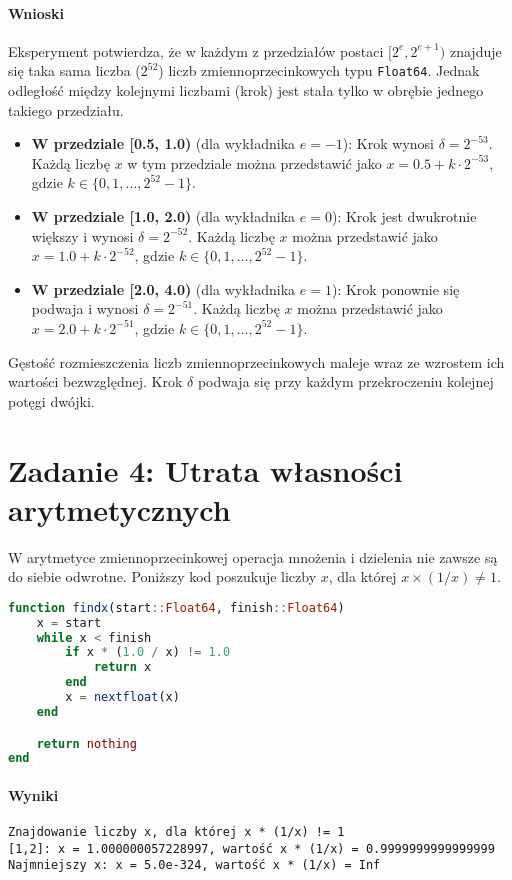 \documentclass[a4paper,12pt]{article}
\begin{document}
\paragraph{Wnioski}
Eksperyment potwierdza, że w każdym z przedziałów postaci $[2^e, 2^{e+1})$ znajduje się taka sama liczba ($2^{52}$) liczb zmiennoprzecinkowych typu \texttt{Float64}. Jednak odległość między kolejnymi liczbami (krok) jest stała tylko w obrębie jednego takiego przedziału.

\begin{itemize}
    \item \textbf{W przedziale [0.5, 1.0)} (dla wykładnika $e=-1$): Krok wynosi $\delta = 2^{-53}$. Każdą liczbę $x$ w tym przedziale można przedstawić jako $x = 0.5 + k \cdot 2^{-53}$, gdzie $k \in \{0, 1, \dots, 2^{52}-1\}$.
    \item \textbf{W przedziale [1.0, 2.0)} (dla wykładnika $e=0$): Krok jest dwukrotnie większy i wynosi $\delta = 2^{-52}$. Każdą liczbę $x$ można przedstawić jako $x = 1.0 + k \cdot 2^{-52}$, gdzie $k \in \{0, 1, \dots, 2^{52}-1\}$.
    \item \textbf{W przedziale [2.0, 4.0)} (dla wykładnika $e=1$): Krok ponownie się podwaja i wynosi $\delta = 2^{-51}$. Każdą liczbę $x$ można przedstawić jako $x = 2.0 + k \cdot 2^{-51}$, gdzie $k \in \{0, 1, \dots, 2^{52}-1\}$.
\end{itemize}

Gęstość rozmieszczenia liczb zmiennoprzecinkowych maleje wraz ze wzrostem ich wartości bezwzględnej. Krok $\delta$ podwaja się przy każdym przekroczeniu kolejnej potęgi dwójki.

\section{Zadanie 4: Utrata własności arytmetycznych}

W arytmetyce zmiennoprzecinkowej operacja mnożenia i dzielenia nie zawsze są do siebie odwrotne. Poniższy kod poszukuje liczby $x$, dla której $x \times (1/x) \neq 1$.

\begin{lstlisting}[language=Julia]
function findx(start::Float64, finish::Float64)
    x = start
    while x < finish
        if x * (1.0 / x) != 1.0
            return x
        end
        x = nextfloat(x)
    end

    return nothing
end
\end{lstlisting}

\paragraph{Wyniki}
\begin{verbatim}
Znajdowanie liczby x, dla której x * (1/x) != 1
[1,2]: x = 1.000000057228997, wartość x * (1/x) = 0.9999999999999999
Najmniejszy x: x = 5.0e-324, wartość x * (1/x) = Inf
\end{verbatim}
\end{document}
